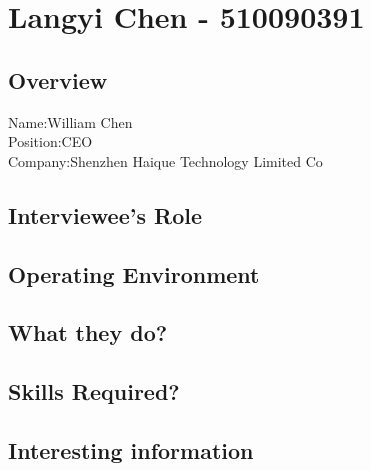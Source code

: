\chapter{Langyi Chen - 510090391}

\section{Overview}
\noindent Name:William Chen
\\
Position:CEO
\\
Company:Shenzhen Haique Technology Limited Co

\section{Interviewee's Role}

\section{Operating Environment}

\section{What they do?}

\section{Skills Required?}

\section{Interesting information}
